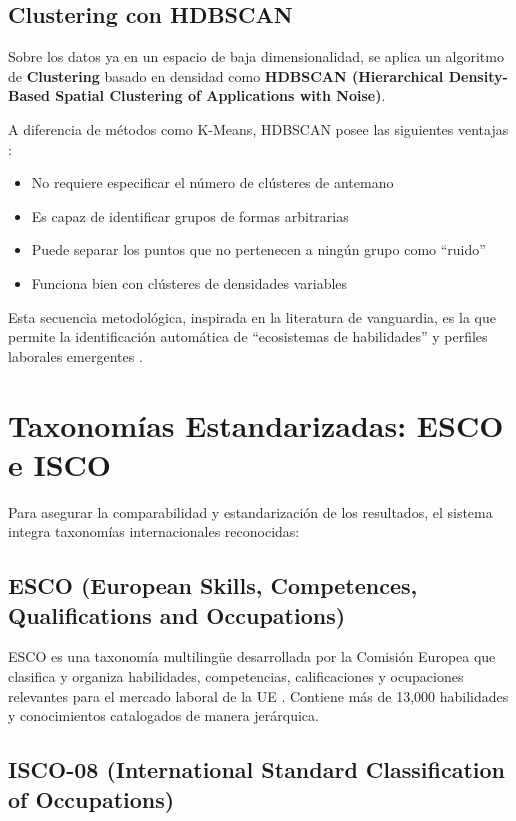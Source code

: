 \subsection{Clustering con HDBSCAN}

Sobre los datos ya en un espacio de baja dimensionalidad, se aplica un algoritmo de \textbf{Clustering} basado en densidad como \textbf{HDBSCAN (Hierarchical Density-Based Spatial Clustering of Applications with Noise)}.

A diferencia de métodos como K-Means, HDBSCAN posee las siguientes ventajas \cite{lukauskas2023}:

\begin{itemize}
    \item No requiere especificar el número de clústeres de antemano
    \item Es capaz de identificar grupos de formas arbitrarias
    \item Puede separar los puntos que no pertenecen a ningún grupo como ``ruido''
    \item Funciona bien con clústeres de densidades variables
\end{itemize}

Esta secuencia metodológica, inspirada en la literatura de vanguardia, es la que permite la identificación automática de ``ecosistemas de habilidades'' y perfiles laborales emergentes \cite{lukauskas2023}.

\section{Taxonomías Estandarizadas: ESCO e ISCO}

Para asegurar la comparabilidad y estandarización de los resultados, el sistema integra taxonomías internacionales reconocidas:

\subsection{ESCO (European Skills, Competences, Qualifications and Occupations)}

ESCO es una taxonomía multilingüe desarrollada por la Comisión Europea que clasifica y organiza habilidades, competencias, calificaciones y ocupaciones relevantes para el mercado laboral de la UE \cite{kavargyris2025}. Contiene más de 13,000 habilidades y conocimientos catalogados de manera jerárquica.

\subsection{ISCO-08 (International Standard Classification of Occupations)}

